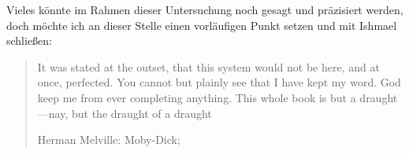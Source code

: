 Vieles könnte im Rahmen dieser Untersuchung noch gesagt und präzisiert werden,
doch möchte ich an dieser Stelle einen vorläufigen Punkt setzen und mit Ishmael
schließen: \foreignblockquote{english}[{Herman Melville: Moby-Dick;
\cite[159]{melville:mobydick}}]{It was stated at the outset, that this system
would not be here, and at once, perfected. You cannot but plainly see that I
have kept my word.
\textelp{}
God keep me from ever completing anything. This whole book is but a
draught---nay, but the draught of a draught}. %
